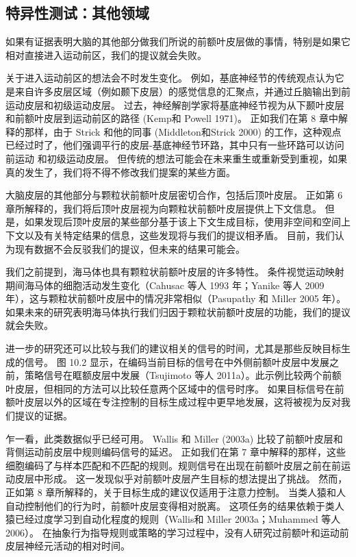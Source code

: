 \subsection{特异性测试：其他领域}
如果有证据表明大脑的其他部分做我们所说的前额叶皮层做的事情，特别是如果它相对直接进入运动前区，我们的提议就会失败。
\par 
关于进入运动前区的想法会不时发生变化。 例如，基底神经节的传统观点认为它是来自许多皮层区域（例如颞下皮层）的感觉信息的汇聚点，并通过丘脑输出到前运动皮层和初级运动皮层。 过去，神经解剖学家将基底神经节视为从下颞叶皮层和前额叶皮层到运动前区的路径 (Kemp和 Powell 1971)。 正如我们在第 8 章中解释的那样，由于 Strick 和他的同事 (Middleton和Strick 2000) 的工作，这种观点已经过时了，他们强调平行的皮层-基底神经节环路，其中只有一些环路可以访问前运动 和初级运动皮层。 但传统的想法可能会在未来重生或重新受到重视，如果真的发生了，我们将不得不修改我们提案的某些方面。
\par 
大脑皮层的其他部分与颗粒状前额叶皮层密切合作，包括后顶叶皮层。 正如第 6 章所解释的，我们将后顶叶皮层视为向颗粒状前额叶皮层提供上下文信息。 但是，如果发现后顶叶皮层的某些部分基于该上下文生成目标，使用非空间和空间上下文以及有关特定结果的信息，这些发现将与我们的提议相矛盾。 目前，我们认为现有数据不会反驳我们的提议，但未来的结果可能会。
\par 
我们之前提到，海马体也具有颗粒状前额叶皮层的许多特性。 条件视觉运动映射期间海马体的细胞活动发生变化（Cahusac 等人 1993 年；Yanike 等人 2009 年），这与颗粒状前额叶皮层中的情况非常相似（Pasupathy 和 Miller 2005 年）。 如果未来的研究表明海马体执行我们归因于颗粒状前额叶皮层的功能，我们的提议就会失败。
\par 
进一步的研究还可以比较与我们的建议相关的信号的时间，尤其是那些反映目标生成的信号。 图 10.2 显示，在编码当前目标的信号在中外侧前额叶皮层中发展之前，策略信号在眶额皮层中发展（Tsujimoto 等人 2011a）。此示例比较两个前额叶皮层，但相同的方法可以比较任意两个区域中的信号时序。 如果目标信号在前额叶皮层以外的区域在专注控制的目标生成过程中更早地发展，这将被视为反对我们提议的证据。
\par 
乍一看，此类数据似乎已经可用。 Wallis 和 Miller (2003a) 比较了前额叶皮层和背侧运动前皮层中规则编码信号的延迟。 正如我们在第 7 章中解释的那样，这些细胞编码了与样本匹配和不匹配的规则。规则信号在出现在前额叶皮层之前在前运动皮层中形成。 这一发现似乎对前额叶皮层产生目标的想法提出了挑战。 然而，正如第 8 章所解释的，关于目标生成的建议仅适用于注意力控制。 当类人猿和人自动控制他们的行为时，前额叶皮层变得相对脱离。 这项任务的结果依赖于类人猿已经过度学习到自动化程度的规则（Wallis和 Miller 2003a；Muhammed 等人 2006）。 在抽象行为指导规则或策略的学习过程中，没有人研究过前额叶和运动前皮层神经元活动的相对时间。
